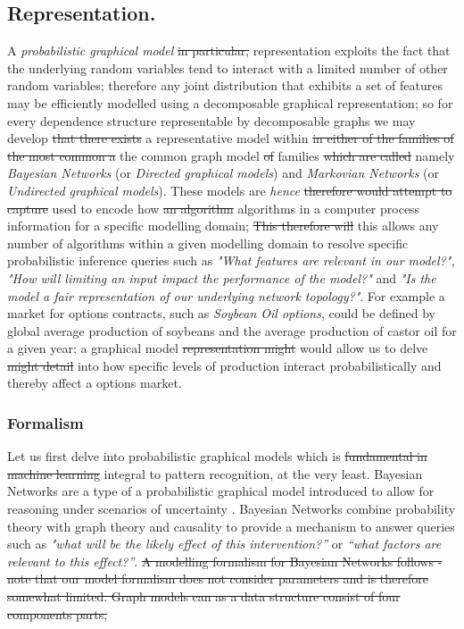 \documentclass[7pt]{article}
\begin{document}
\subsection{Representation.}
A \emph{probabilistic graphical model} \st{in particular,} representation exploits the fact that the underlying random variables tend to interact with a limited number of other random variables; therefore any joint distribution that exhibits a set of features may be efficiently modelled using a decomposable graphical representation; so for every dependence structure representable by decomposable graphs we may develop \st{that there exists} a representative model within \st{in either of the families of the most common a} the common graph model \st{of} families \st{which are called} namely  \emph{Bayesian Networks}  (or \emph{Directed graphical models}) and \emph{Markovian Networks}  (or \emph{Undirected graphical models}). These models are \emph{hence} \st{therefore would attempt to capture} used to encode how \st{an algorithm} algorithms in a computer process information for a specific modelling domain; \st{This therefore will} this allows any number of algorithms within a given modelling domain to resolve specific probabilistic inference queries such as \emph{"What features are relevant in our model?", "How will limiting an input impact the performance of the model?"} and \emph{"Is the model a fair representation of our underlying network topology?"}.  For example a market for options contracts, such as \emph{Soybean Oil options}, could be defined by global average production of soybeans and the average production of castor oil for a given year; a graphical model \st{representation might} would allow us to delve \st{might detail} into how specific levels of production interact probabilistically and thereby affect a options market.

\subsubsection{Formalism}
Let us first delve into probabilistic graphical models which is \st{fundamental in machine learning} integral to pattern recognition, at the very least. Bayesian Networks are a type of a probabilistic graphical model introduced to allow for reasoning under scenarios of uncertainty \cite{pearl1985bayesian, pearl1988probabilistic}.  Bayesian Networks combine probability theory with graph theory and causality to provide a mechanism to answer queries such as \emph{"what will be the likely effect of this intervention?”} or \emph{“what factors are relevant to this effect?”}. \st{A modelling formalism for Bayesian Networks follows - note that our model formalism does not consider parameters and is therefore somewhat limited.  Graph models can as a data structure consist of four components parts,}
\end{document}
